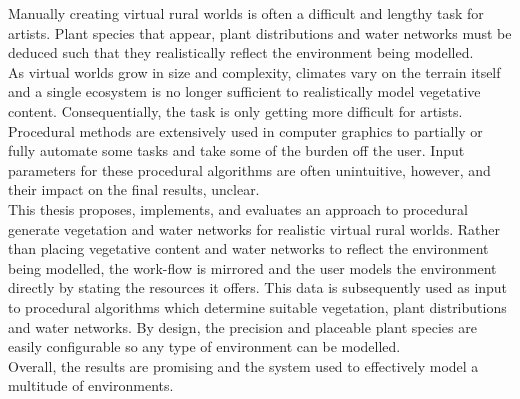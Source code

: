 Manually creating virtual rural worlds is often a difficult and lengthy task for artists. Plant species that appear, plant distributions and water networks must be deduced such that they realistically reflect the environment being modelled.\\
As virtual worlds grow in size and complexity, climates vary on the terrain itself and a single ecosystem is no longer sufficient to realistically model vegetative content. Consequentially, the task is only getting more difficult for artists.\\
Procedural methods are extensively used in computer graphics to partially or fully automate some tasks and take some of the burden off the user. Input parameters for these procedural algorithms are often unintuitive, however, and their impact on the final results, unclear.  \\
This thesis proposes, implements, and evaluates an approach to procedural generate vegetation and water networks for realistic virtual rural worlds. Rather than placing vegetative content and water networks to reflect the environment being modelled, the work-flow is mirrored and the user models the environment directly by stating the resources it offers. This data is subsequently used as input to procedural algorithms which determine suitable vegetation, plant distributions and water networks. By design, the precision and placeable plant species are easily configurable so any type of environment can be modelled. \\
Overall, the results are promising and the system used to effectively model a multitude of environments. \\